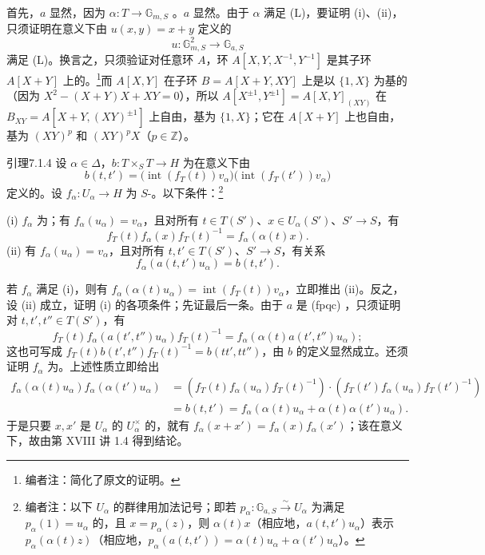 首先，$a$ 显然，因为 $\alpha:T\to\mathbb G_{m,S}$ 。$a$ 显然。由于 $\alpha$ 满足 (L)，要证明 (i)、(ii)，只须证明在意义下由 $u(x,y)=x+y$ 定义的
\[u:\mathbb G_{m,S}^2\longrightarrow\mathbb G_{a,S}\]
满足 (L)。换言之，只须验证对任意环 $A$，环 $A[X,Y,X^{-1},Y^{-1}]$ 是其子环 $A[X+Y]$ 上的。\footnote{编者注：简化了原文的证明。}而 $A[X,Y]$ 在子环 $B=A[X+Y,XY]$ 上是以 $\{1,X\}$ 为基的（因为 $X^2-(X+Y)X+XY=0$），所以 $A[X^{\pm1},Y^{\pm1}]=A[X,Y]_{(XY)}$ 在 $B_{XY}=A[X+Y,(XY)^{\pm1}]$ 上自由，基为 $\{1,X\}$；它在 $A[X+Y]$ 上也自由，基为 $(XY)^p$ 和 $(XY)^pX$（$p\in\mathbb Z$）。
\begin{SGAresult}{引理}{7.1.4}
设 $\alpha\in\Delta$，$b:T\times_ST\to H$ 为在意义下由
\[b(t,t')=\bigl(\operatorname{int}(f_T(t))v_\alpha\bigr)\bigl(\operatorname{int}(f_T(t'))v_\alpha\bigr)\]
定义的。设 $f_\alpha:U_\alpha\to H$ 为 $S$-。以下条件：\footnote{编者注：以下 $U_\alpha$ 的群律用加法记号；即若 $p_\alpha:\mathbb G_{a,S}\xrightarrow{\sim}U_\alpha$ 为满足 $p_\alpha(1)=u_\alpha$ 的，且 $x=p_\alpha(z)$，则 $\alpha(t)x$（相应地，$a(t,t')u_\alpha$）表示 $p_\alpha(\alpha(t)z)$（相应地，$p_\alpha(a(t,t'))=\alpha(t)u_\alpha+\alpha(t')u_\alpha$）。}

(i) $f_\alpha$ 为；有 $f_\alpha(u_\alpha)=v_\alpha$，且对所有 $t\in T(S')$、$x\in U_\alpha(S')$、$S'\to S$，有
\[f_T(t)f_\alpha(x)f_T(t)^{-1}=f_\alpha(\alpha(t)x).\]
(ii) 有 $f_\alpha(u_\alpha)=v_\alpha$，且对所有 $t,t'\in T(S')$、$S'\to S$，有关系
\[f_\alpha(a(t,t')u_\alpha)=b(t,t').\]
\end{SGAresult}
若 $f_\alpha$ 满足 (i)，则有 $f_\alpha(\alpha(t)u_\alpha)=\operatorname{int}(f_T(t))v_\alpha$，立即推出 (ii)。反之，设 (ii) 成立，证明 (i) 的各项条件；先证最后一条。由于 $a$ 是 (fpqc) ，只须证明对 $t,t',t''\in T(S')$，有
\[f_T(t)f_\alpha(a(t',t'')u_\alpha)f_T(t)^{-1}=f_\alpha(\alpha(t)a(t',t'')u_\alpha);\]
这也可写成 $f_T(t)b(t',t'')f_T(t)^{-1}=b(tt',tt'')$，由 $b$ 的定义显然成立。还须证明 $f_\alpha$ 为。上述性质立即给出
\[\begin{aligned}
f_\alpha(\alpha(t)u_\alpha)f_\alpha(\alpha(t')u_\alpha)
&=(f_T(t)f_\alpha(u_\alpha)f_T(t)^{-1})\cdot(f_T(t')f_\alpha(u_\alpha)f_T(t')^{-1})\\
&=b(t,t')=f_\alpha(\alpha(t)u_\alpha+\alpha(t)\alpha(t')u_\alpha).
\end{aligned}\]
于是只要 $x,x'$ 是 $U_\alpha$ 的 $U_\alpha^\times$ 的，就有 $f_\alpha(x+x')=f_\alpha(x)f_\alpha(x')$；该在意义下，故由第 XVIII 讲 1.4 得到结论。

